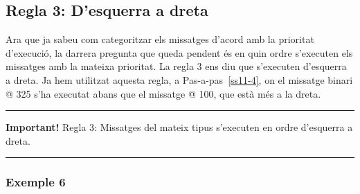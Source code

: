 \subsection{Regla 3: D'esquerra a dreta}
Ara que ja sabeu com categoritzar els missatges d'acord amb la prioritat d'execució, la darrera pregunta que queda pendent és en quin ordre s'executen els missatges amb la mateixa prioritat. La regla 3 ens diu que s'executen d'esquerra a dreta. Ja hem utilitzat aquesta regla, a Pas-a-pas~\ref{ss11-4}, on el missatge binari \textsf{@ 325} s'ha executat abans que el missatge \textsf{@ 100}, que està més a la dreta.

\noindent
\rule{\textwidth}{2pt}
\noindent
\textbf{Important!} Regla 3: Missatges del mateix tipus s'executen en ordre d'esquerra a dreta.

\noindent
\rule{\textwidth}{2pt}

\subsubsection*{Exemple 6}

